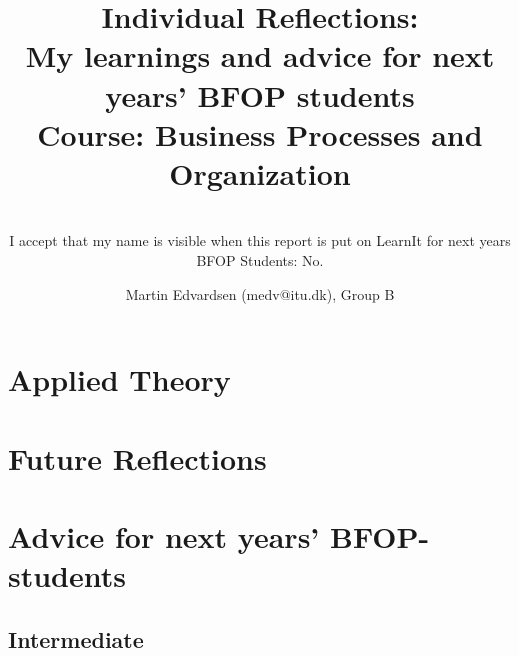 \documentclass{report}
\title
{
	\textbf{Individual Reflections: \\ My learnings and advice for next years' BFOP students} \\
	\textbf{Course:} Business Processes and Organization
}
\author
{
	Martin Edvardsen (medv@itu.dk), Group B \\
}
\subtitle
{
	~\\
	I accept that my name is visible when this report is put on LearnIt for next years BFOP Students: No.
}
\begin{document}
\maketitle

\chapter{Applied Theory}
	\label{tools}
	
\chapter{Future Reflections}
	\label{future}
	
\chapter{Advice for next years' BFOP-students}
	\label{advice}
	




\begin{appendices}
	\chapter{Intermediate}\label{interviews}
\end{appendices}
\end{document}
